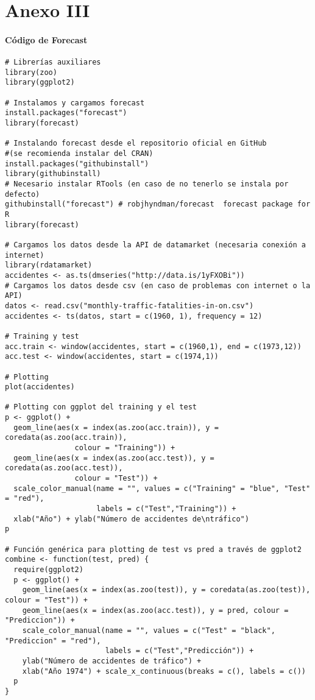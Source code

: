 \documentclass[12pt,a4paper,oneside]{article}
\begin{document}
\part*{Anexo III}

\subsection*{Código de Forecast}

\begin{Verbatim}[fontsize=\footnotesize]
# Librerías auxiliares
library(zoo)
library(ggplot2)

# Instalamos y cargamos forecast
install.packages("forecast")
library(forecast)

# Instalando forecast desde el repositorio oficial en GitHub
#(se recomienda instalar del CRAN)
install.packages("githubinstall")
library(githubinstall)
# Necesario instalar RTools (en caso de no tenerlo se instala por defecto)
githubinstall("forecast") # robjhyndman/forecast  forecast package for R
library(forecast)

# Cargamos los datos desde la API de datamarket (necesaria conexión a internet)
library(rdatamarket)
accidentes <- as.ts(dmseries("http://data.is/1yFXOBi"))
# Cargamos los datos desde csv (en caso de problemas con internet o la API)
datos <- read.csv("monthly-traffic-fatalities-in-on.csv")
accidentes <- ts(datos, start = c(1960, 1), frequency = 12)

# Training y test
acc.train <- window(accidentes, start = c(1960,1), end = c(1973,12))
acc.test <- window(accidentes, start = c(1974,1))

# Plotting
plot(accidentes)

# Plotting con ggplot del training y el test
p <- ggplot() +
  geom_line(aes(x = index(as.zoo(acc.train)), y = coredata(as.zoo(acc.train)),
                colour = "Training")) +
  geom_line(aes(x = index(as.zoo(acc.test)), y = coredata(as.zoo(acc.test)),
                colour = "Test")) +
  scale_color_manual(name = "", values = c("Training" = "blue", "Test" = "red"),
                     labels = c("Test","Training")) +
  xlab("Año") + ylab("Número de accidentes de\ntráfico")
p

# Función genérica para plotting de test vs pred a través de ggplot2
combine <- function(test, pred) {
  require(ggplot2)
  p <- ggplot() +
    geom_line(aes(x = index(as.zoo(test)), y = coredata(as.zoo(test)), colour = "Test")) +
    geom_line(aes(x = index(as.zoo(acc.test)), y = pred, colour = "Prediccion")) +
    scale_color_manual(name = "", values = c("Test" = "black", "Prediccion" = "red"),
                       labels = c("Test","Predicción")) +
    ylab("Número de accidentes de tráfico") +
    xlab("Año 1974") + scale_x_continuous(breaks = c(), labels = c())
  p
}


\end{Verbatim}
\end{document}
